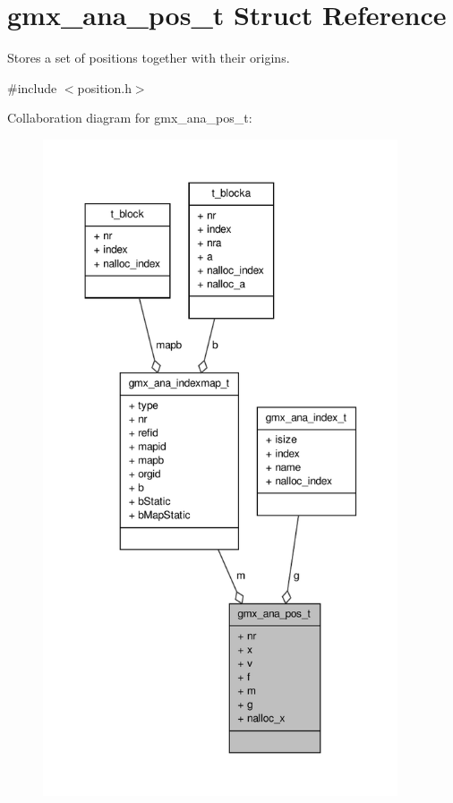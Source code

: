 \hypertarget{structgmx__ana__pos__t}{\section{gmx\-\_\-ana\-\_\-pos\-\_\-t \-Struct \-Reference}
\label{structgmx__ana__pos__t}
}


\-Stores a set of positions together with their origins.  




{\ttfamily \#include $<$position.\-h$>$}



\-Collaboration diagram for gmx\-\_\-ana\-\_\-pos\-\_\-t\-:
\nopagebreak
\begin{figure}[H]
\begin{center}
\leavevmode
\includegraphics[height=550pt]{structgmx__ana__pos__t__coll__graph}
\end{center}
\end{figure}
